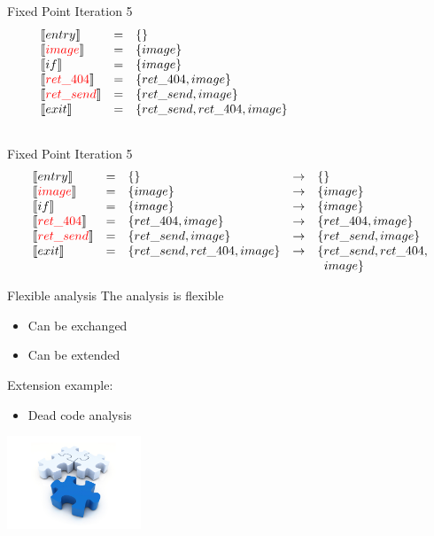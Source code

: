 \begin{frame}{Fixed Point Iteration 5}
\[
\begin{array}{lclcl}
  \constraint{entry} & = & \{\} &&\\
  \assignconstraint{image} & = & \{image\} &&\\
  \constraint{if} & = & \{image\} &&\\
  \assignconstraint{ret\_404} & = & \{ret\_404, image\} &&\\
  \assignconstraint{ret\_send} & = & \{ret\_send, image\} &&\\
  \constraint{exit} & = & \{ret\_send, ret\_404, image\} &&\\
  && \phantom{\{command, param\}} && \phantom{\{command, param\}}
\end{array}
\]
\end{frame}

\begin{frame}{Fixed Point Iteration 5}
\[
\begin{array}{lclcl}
  \llbracket entry \rrbracket & = & \{\} & \rightarrow & \{\}\\
  \llbracket {\color{red}image} \rrbracket & = & \{image\} & \rightarrow &\{image\}\\
  \llbracket if \rrbracket & = & \{image\} & \rightarrow &\{image\}\\
  \llbracket {\color{red}ret\_404} \rrbracket & = & \{ret\_404, image\} & \rightarrow &\{ret\_404, image\}\\
  \llbracket {\color{red}ret\_send} \rrbracket & = & \{ret\_send, image\} & \rightarrow &\{ret\_send, image\}\\
  \llbracket exit \rrbracket & = & \{ret\_send, ret\_404, image\} & \rightarrow & \{ret\_send, ret\_404,\\
&&&& \phantom{a}image\}
\end{array}
\]
\end{frame}

\begin{frame}{Flexible analysis}
  The analysis is flexible
  \begin{itemize}
    \item Can be exchanged
    \item Can be extended
  \end{itemize}

 Extension example:
  \begin{itemize}
    \item Dead code analysis
  \end{itemize}
  \center
  \includegraphics[width=0.3\textwidth]{graphics/modular}
\end{frame}

